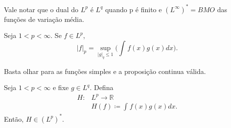 \documentclass[measure_theory.tex]{subfiles}
\begin{document}
Vale notar que o dual do \(L^{p}\) é \(L^{q}\) quando p é finito e \((L^{\infty})^{*} = BMO\) das funções de variação média.
\begin{theorem*}
	Seja \(1< p < \infty\). Se \(f\in L^{p}\),
	\[
		|f|_{p}=\sup_{|g|_{q}\leq 1}\biggl(\int_{}^{}f(x)g(x)dx\biggr).
	\]
\end{theorem*}
\begin{crl*}
	Basta olhar para as funções simples e a proposição continua válida.
\end{crl*}
\begin{prop*}
	Seja \(1 < p < \infty\) e fixe \(g\in L^{q}\). Defina
	\begin{align*}
		H: & L^{p}\rightarrow \mathbb{R}         \\
		   & H(f)\coloneqq \int_{}^{}f(x)g(x)dx.
	\end{align*}
	Então, \(H\in (L^{p})^{*}.\)
\end{prop*}
\end{document}
